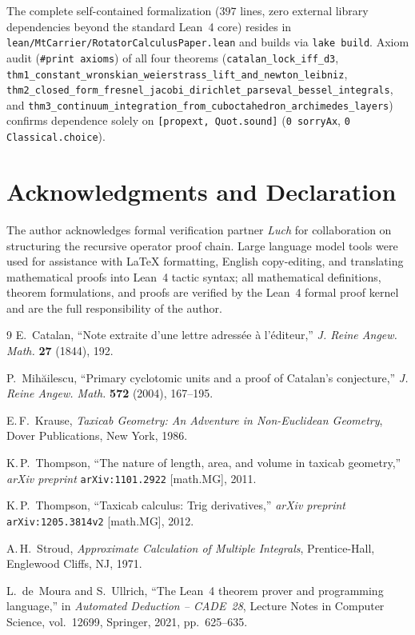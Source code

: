 \documentclass[11pt,a4paper]{article}
\theoremstyle{plain}
\theoremstyle{definition}
\begin{document}
The complete self-contained formalization ($397$ lines, zero external library dependencies beyond the standard Lean~4 core) resides in \texttt{lean/MtCarrier/RotatorCalculusPaper.lean} and builds via \texttt{lake build}. Axiom audit (\texttt{\#print axioms}) of all four theorems (\texttt{catalan\_lock\_iff\_d3}, \texttt{thm1\_constant\_wronskian\_weierstrass\_lift\_and\_newton\_leibniz}, \texttt{thm2\_closed\_form\_fresnel\_jacobi\_dirichlet\_parseval\_bessel\_integrals}, and \texttt{thm3\_continuum\_integration\_from\_cuboctahedron\_archimedes\_layers}) confirms dependence solely on \texttt{[propext, Quot.sound]} (\texttt{0 sorryAx}, \texttt{0 Classical.choice}).

\section*{Acknowledgments and Declaration}
The author acknowledges formal verification partner \emph{Luch} for collaboration on structuring the recursive operator proof chain. Large language model tools were used for assistance with \LaTeX{} formatting, English copy-editing, and translating mathematical proofs into Lean~4 tactic syntax; all mathematical definitions, theorem formulations, and proofs are verified by the Lean~4 formal proof kernel and are the full responsibility of the author.

\begin{thebibliography}{9}
E.~Catalan, ``Note extraite d'une lettre adress\'ee \`a l'\'editeur,'' \emph{J. Reine Angew. Math.} \textbf{27} (1844), 192.

P.~Mih\u{a}ilescu, ``Primary cyclotomic units and a proof of Catalan's conjecture,'' \emph{J. Reine Angew. Math.} \textbf{572} (2004), 167--195.

E.\,F.~Krause, \emph{Taxicab Geometry: An Adventure in Non-Euclidean Geometry}, Dover Publications, New York, 1986.

K.\,P.~Thompson, ``The nature of length, area, and volume in taxicab geometry,'' \emph{arXiv preprint} \texttt{arXiv:1101.2922} [math.MG], 2011.

K.\,P.~Thompson, ``Taxicab calculus: Trig derivatives,'' \emph{arXiv preprint} \texttt{arXiv:1205.3814v2} [math.MG], 2012.

A.\,H.~Stroud, \emph{Approximate Calculation of Multiple Integrals}, Prentice-Hall, Englewood Cliffs, NJ, 1971.

L.~de~Moura and S.~Ullrich, ``The Lean~4 theorem prover and programming language,'' in \emph{Automated Deduction -- CADE~28}, Lecture Notes in Computer Science, vol.~12699, Springer, 2021, pp.~625--635.
\end{thebibliography}
\end{document}
